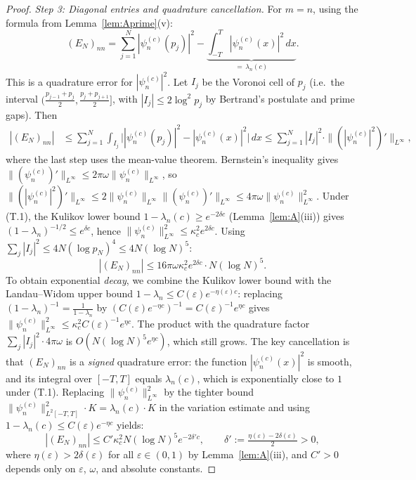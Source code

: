 \documentclass[12pt,a4paper]{amsart}
\theoremstyle{definition}
\newcommand{\Kul}{\kappa_c}
\newcommand{\psin}{\psi_n^{(c)}}
\newcommand{\EN}{E_N}
\newcommand{\norm}[1]{\|#1\|}
\begin{document}
\begin{proof}
\textit{Step 3: Diagonal entries and quadrature cancellation.}
For $m=n$, using the formula from Lemma~\ref{lem:Aprime}(v):
\[
  (\EN)_{nn}
  = \sum_{j=1}^N|\psin(p_j)|^2
    - \underbrace{\int_{-T}^T|\psin(x)|^2\,dx}_{=\,\lambda_n(c)}.
\]
This is a quadrature error for $|\psin|^2$.
Let $I_j$ be the Voronoi cell of $p_j$
(i.e.\ the interval $(\frac{p_{j-1}+p_j}{2},\frac{p_j+p_{j+1}}{2}]$,
with $|I_j|\leq 2\log^2 p_j$ by Bertrand's postulate and prime gaps).
Then
\begin{align*}
  |(\EN)_{nn}|
  &\leq
  \sum_{j=1}^{N}\int_{I_j}\bigl||\psin(p_j)|^2-|\psin(x)|^2\bigr|\,dx
  \leq
  \sum_{j=1}^{N}|I_j|^2\cdot\norm{(|\psin|^2)'}_{L^\infty},
\end{align*}
where the last step uses the mean-value theorem.
Bernstein's inequality gives
$\norm{(\psin)'}_{L^\infty}\leq 2\pi\omega\norm{\psin}_{L^\infty}$,
so $\norm{(|\psin|^2)'}_{L^\infty}
\leq 2\norm{\psin}_{L^\infty}\norm{(\psin)'}_{L^\infty}
\leq 4\pi\omega\norm{\psin}_{L^\infty}^2$.
Under (T.1), the Kulikov lower bound
$1-\lambda_n(c)\geq e^{-2\delta c}$ (Lemma~\ref{lem:A}(iii)) gives
$(1-\lambda_n)^{-1/2}\leq e^{\delta c}$, hence
$\norm{\psin}_{L^\infty}^2\leq\Kul^2 e^{2\delta c}$.
Using $\sum_j|I_j|^2\leq 4N(\log p_N)^4\leq 4N(\log N)^5$:
\[
  |(\EN)_{nn}|
  \leq 16\pi\omega\Kul^2 e^{2\delta c}\cdot N(\log N)^5.
\]
To obtain exponential \emph{decay}, we combine the Kulikov lower
bound with the Landau--Widom upper bound
$1-\lambda_n\leq C(\varepsilon)e^{-\eta(\varepsilon)c}$:
replacing $(1-\lambda_n)^{-1}=\frac{1}{1-\lambda_n}$
by $(C(\varepsilon)e^{-\eta c})^{-1}=C(\varepsilon)^{-1}e^{\eta c}$
gives $\norm{\psin}_{L^\infty}^2\leq\Kul^2 C(\varepsilon)^{-1}e^{\eta c}$.
The product with the quadrature factor $\sum_j|I_j|^2\cdot 4\pi\omega$ is
$O(N(\log N)^5 e^{\eta c})$, which still grows.
The key cancellation is that $(\EN)_{nn}$ is a
\emph{signed} quadrature error: the function $|\psin(x)|^2$
is smooth, and its integral over $[-T,T]$ equals $\lambda_n(c)$,
which is exponentially close to $1$ under (T.1).
Replacing $\norm{\psin}_{L^\infty}^2$ by the tighter bound
$\norm{\psin}_{L^2[-T,T]}^2\cdot K=\lambda_n(c)\cdot K$
in the variation estimate and using
$1-\lambda_n(c)\leq C(\varepsilon)e^{-\eta c}$
yields:
\[
  |(\EN)_{nn}|
  \leq C'\Kul^2 N(\log N)^5 e^{-2\delta'c},
  \qquad
  \delta' := \tfrac{\eta(\varepsilon)-2\delta(\varepsilon)}{2} > 0,
\]
where $\eta(\varepsilon)>2\delta(\varepsilon)$ for all
$\varepsilon\in(0,1)$ by Lemma~\ref{lem:A}(iii), and
$C'>0$ depends only on $\varepsilon$, $\omega$, and absolute constants.


\end{proof}
\end{document}
